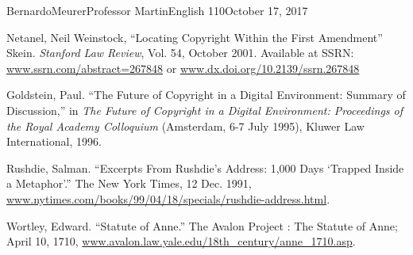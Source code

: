 \documentclass[12pt,letterpaper]{article}
\begin{document}
\begin{mla}{Bernardo}{Meurer}{Professor Martin}{English 110}{October 17, 2017}
\begin{workscited}
            \bibent
            Netanel, Neil Weinstock, ``Locating Copyright Within the First Amendment'' Skein. \textit{Stanford Law Review}, Vol. 54, October 2001. Available at SSRN: \url{www.ssrn.com/abstract=267848} or \url{www.dx.doi.org/10.2139/ssrn.267848}

            \bibent
            Goldstein, Paul. ``The Future of Copyright in a Digital Environment: Summary of Discussion,'' in \textit{The Future of Copyright in a Digital Environment: Proceedings of the Royal Academy Colloquium} (Amsterdam, 6-7 July 1995), Kluwer Law International, 1996.

            \bibent
            Rushdie, Salman. ``Excerpts From Rushdie's Address: 1,000 Days `Trapped Inside a Metaphor'.'' The New York Times, 12 Dec. 1991, \url{www.nytimes.com/books/99/04/18/specials/rushdie-address.html}. 

            \bibent
            Wortley, Edward. ``Statute of Anne.'' The Avalon Project : The Statute of Anne; April 10, 1710, \url{www.avalon.law.yale.edu/18th_century/anne_1710.asp}.
        
        \end{workscited}
        \end{mla}
        
\end{document}
